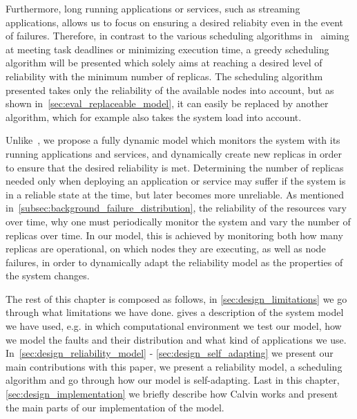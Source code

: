 \documentclass{cslthse-msc}
\begin{document}
Furthermore, long running applications or services, such as streaming applications, allows us to focus on ensuring a desired reliabity even in the event of failures. Therefore, in contrast to the various scheduling algorithms in~\cite{algoOptTimeMaxRel, optTaskAllocationForMaxRel, taskAllocation, taskAllocationSwarm, algoMaxRelEndToEndConstraint, algoMinExTime, schedReplicas} aiming at meeting task deadlines or minimizing execution time, a greedy scheduling algorithm will be presented which solely aims at reaching a desired level of reliability with the minimum number of replicas. The scheduling algorithm presented takes only the reliability of the available nodes into account, but as shown in~\ref{sec:eval_replaceable_model}, it can easily be replaced by another algorithm, which for example also takes the system load into account.

Unlike~\cite{designFaultTolerantSched, evalReplicationSched, taskSchedulingReplication, effTaskReplMobGrid, relGridServicePredConstraint}, we propose a fully dynamic model which monitors the system with its running applications and services, and dynamically create new replicas in order to ensure that the desired reliability is met. Determining the number of replicas needed only when deploying an application or service may suffer if the system is in a reliable state at the time, but later becomes more unreliable. As mentioned in~\cref{subsec:background_failure_distribution}, the reliability of the resources vary over time, why one must periodically monitor the system and vary the number of replicas over time. In our model, this is achieved by monitoring both how many replicas are operational, on which nodes they are executing, as well as node failures, in order to dynamically adapt the reliability model as the properties of the system changes.

The rest of this chapter is composed as follows, in \cref{sec:design_limitations} we go through what limitations we have done.  gives a description of the system model we have used, e.g. in which computational environment we test our model, how we model the faults and their distribution and what kind of applications we use. In~\cref{sec:design_reliability_model} - \cref{sec:design_self_adapting} we present our main contributions with this paper, we present a reliability model, a scheduling algorithm and go through how our model is self-adapting. Last in this chapter, \cref{sec:design_implementation} we briefly describe how Calvin works and present the main parts of our implementation of the model.
\end{document}
